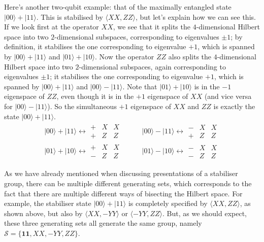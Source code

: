 \documentclass[fleqn]{article}
\begin{document}
Here's another two-qubit example: that of the maximally entangled state \(|00\rangle+|11\rangle\).
This is stabilised by \(\langle XX,ZZ\rangle\), but let's explain how we can see this.
If we look first at the operator \(XX\), we see that it splits the \(4\)-dimensional Hilbert space into two \(2\)-dimensional subspaces, corresponding to eigenvalues \(\pm1\); by definition, it stabilises the one corresponding to eigenvalue \(+1\), which is spanned by \(|00\rangle+|11\rangle\) and \(|01\rangle+|10\rangle\).
Now the operator \(ZZ\) also splits the \(4\)-dimensional Hilbert space into two \(2\)-dimensional subspaces, again corresponding to eigenvalues \(\pm1\); it stabilises the one corresponding to eigenvalue \(+1\), which is spanned by \(|00\rangle+|11\rangle\) and \(|00\rangle-|11\rangle\).
Note that \(|01\rangle+|10\rangle\) is in the \(-1\) eigenspace of \(ZZ\), even though it is in the \(+1\) eigenspace of \(XX\) (and vice versa for \(|00\rangle-|11\rangle\)).
So the simultaneous \(+1\) eigenspace of \(XX\) and \(ZZ\) is exactly the state \(|00\rangle+|11\rangle\).
\[
  \begin{aligned}
    |00\rangle+|11\rangle
    \longleftrightarrow
    \begin{array}{c|cc|}
      +&X&X
    \\+&Z&Z
    \end{array}
    \quad&\quad
    |00\rangle-|11\rangle
    \longleftrightarrow
    \begin{array}{c|cc|}
      -&X&X
    \\+&Z&Z
    \end{array}
  \\|01\rangle+|10\rangle
    \longleftrightarrow
    \begin{array}{c|cc|}
      +&X&X
    \\-&Z&Z
    \end{array}
    \quad&\quad
    |01\rangle-|10\rangle
    \longleftrightarrow
    \begin{array}{c|cc|}
      -&X&X
    \\-&Z&Z
    \end{array}
  \end{aligned}
\]

As we have already mentioned when discussing presentations of a stabiliser group, there can be multiple different generating sets, which corresponds to the fact that there are multiple different ways of bisecting the Hilbert space.
For example, the stabiliser state \(|00\rangle+|11\rangle\) is completely specified by \(\langle XX,ZZ\rangle\), as shown above, but also by \(\langle XX,-YY\rangle\) or \(\langle -YY,ZZ\rangle\).
But, as we should expect, these three generating sets all generate the same group, namely \(\mathcal{S}=\{\mathbf{1}\mathbf{1},XX,-YY,ZZ\}\).
\end{document}
